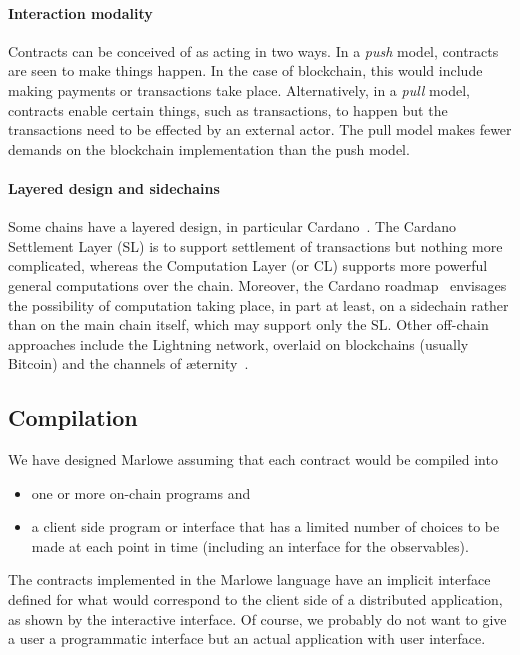 \documentclass[runningheads]{llncs}
\begin{document}
\paragraph{Interaction modality}

Contracts can be conceived of as acting in two ways. In a \emph{push} model, contracts are seen to make things happen. In the case of blockchain, this would include making payments or transactions take place. 
Alternatively, in a \emph{pull} model, contracts enable certain things, such as transactions,  to happen but the 
transactions need to be effected by an external actor. The pull model makes fewer demands on the blockchain implementation than the push model.

\paragraph{Layered design and sidechains}

Some chains have a layered design, in particular Cardano~\cite{cardano}. The Cardano Settlement Layer (SL) is to support settlement of transactions but nothing more complicated, whereas the Computation Layer (or CL) supports more powerful general computations over the chain. Moreover, the Cardano roadmap~\cite{cardano-rationale} envisages the possibility of computation taking place, in part at least, on a sidechain rather than on the main chain itself, which 
may support only the SL. Other off-chain approaches include the Lightning network, overlaid on blockchains (usually Bitcoin) and the channels of \ae{}ternity~\cite{aeternity}.



\subsection{Compilation}
\label{sec:compilation}

We have designed Marlowe assuming that each contract would be compiled into
\begin{itemize} 
\item one or more on-chain programs and 
\item a client side program or interface that has a limited number of choices to be made at each point in time (including an interface for the observables). 
\end{itemize}
The contracts implemented in the Marlowe language have an implicit interface defined for what would correspond to the client side of a distributed application, as shown by the interactive interface. 
Of course, we probably do not want to give a user a programmatic interface but an actual application with user interface. 
\end{document}
